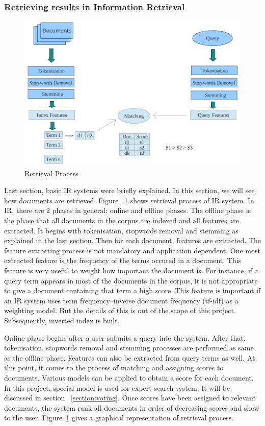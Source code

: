 \subsubsection{Retrieving results in Information Retrieval}\label{section:retrieving}
\begin{figure}
\centering
\includegraphics[scale=0.3]{./figures/retrieval.png}
\caption{Retrieval Process} \label{fig:retrieval} 
\end{figure}
Last section, basic IR systems were briefly explained. In this section, we will see how documents are retrieved. Figure ~\ref{fig:retrieval} shows
retrieval process of IR system. In IR, there are 2 phases in general:
online and offline phases. The offline phase is the phase that all documents in the corpus are indexed and all features are extracted. It begins with
tokenisation, stopwords removal and stemming as explained in the last section. Then for each document, features are extracted. The feature extracting
process is not mandatory and application dependent. One most extracted feature is the frequency of the terms occured in a document. This feature is very useful
to weight how important the document is. For instance, if a query term appears in most of the documents in the corpus, it is not appropriate to give a 
document containing that term a high score. This feature is important if an IR system uses term frequency–inverse document frequency (tf-idf) as a weighting model. But the details
of this is out of the scope of this project. Subsequently, inverted index is built.

Online phase begins after a user submits a query into the system. After that, tokenisation, stopwords removal and stemming processes are performed as same
as the offline phase. Features can also be extracted from query terms as well. At this point, it comes to the process of matching and assigning scores to documents.
Various models can be applied to obtain a score for each document. In this project, special model is used for expert search system. It will be discussed
in section ~\ref{section:voting}. Once scores have been assigned to relevant documents, the system rank all documents in order of decreasing scores and 
show to the user. Figure~\ref{fig:retrieval} gives a graphical representation of retrieval process.

